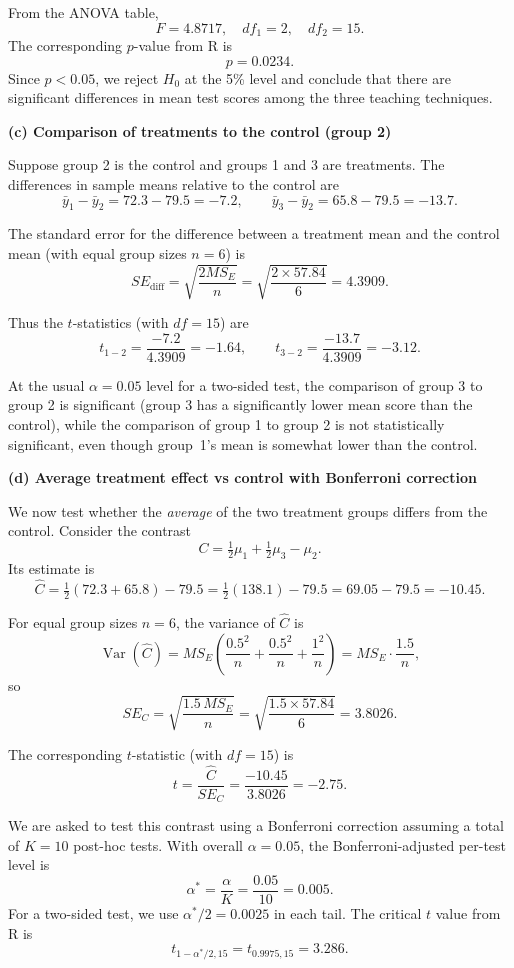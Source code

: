 \documentclass[answers,12pt,addpoints]{exam}
\begin{document}
From the ANOVA table,
\[
F = 4.8717,\quad df_1 = 2,\quad df_2 = 15.
\]
The corresponding $p$-value from R is
\[
p = 0.0234.
\]
Since $p < 0.05$, we reject $H_0$ at the 5\% level and conclude that there are
significant differences in mean test scores among the three teaching
techniques.

\medskip
\textbf{(c) Comparison of treatments to the control (group 2)}

Suppose group 2 is the control and groups 1 and 3 are treatments. The
differences in sample means relative to the control are
\[
\bar{y}_1 - \bar{y}_2 = 72.3 - 79.5 = -7.2,\qquad
\bar{y}_3 - \bar{y}_2 = 65.8 - 79.5 = -13.7.
\]

The standard error for the difference between a treatment mean and the control
mean (with equal group sizes $n=6$) is
\[
SE_{\text{diff}} = \sqrt{\frac{2 MS_E}{n}}
= \sqrt{\frac{2 \times 57.84}{6}} = 4.3909.
\]

Thus the $t$-statistics (with $df = 15$) are
\[
t_{1-2} = \frac{-7.2}{4.3909} = -1.64,\qquad
t_{3-2} = \frac{-13.7}{4.3909} = -3.12.
\]

At the usual $\alpha = 0.05$ level for a two-sided test, the comparison of
group 3 to group 2 is significant (group 3 has a significantly lower mean
score than the control), while the comparison of group 1 to group 2 is not
statistically significant, even though group~1's mean is somewhat lower than
the control.

\medskip
\textbf{(d) Average treatment effect vs control with Bonferroni correction}

We now test whether the \emph{average} of the two treatment groups differs from
the control. Consider the contrast
\[
C = \tfrac{1}{2}\mu_1 + \tfrac{1}{2}\mu_3 - \mu_2.
\]
Its estimate is
\[
\hat{C} = \tfrac{1}{2}(72.3 + 65.8) - 79.5
= \tfrac{1}{2}(138.1) - 79.5 = 69.05 - 79.5 = -10.45.
\]

For equal group sizes $n=6$, the variance of $\hat{C}$ is
\[
\operatorname{Var}(\hat{C}) =
MS_E\left(\frac{0.5^2}{n} + \frac{0.5^2}{n} + \frac{1^2}{n}\right)
= MS_E\cdot\frac{1.5}{n},
\]
so
\[
SE_C = \sqrt{\frac{1.5\,MS_E}{n}}
= \sqrt{\frac{1.5 \times 57.84}{6}} = 3.8026.
\]

The corresponding $t$-statistic (with $df = 15$) is
\[
t = \frac{\hat{C}}{SE_C} = \frac{-10.45}{3.8026} = -2.75.
\]

We are asked to test this contrast using a Bonferroni correction assuming a
total of $K = 10$ post-hoc tests. With overall $\alpha = 0.05$, the
Bonferroni-adjusted per-test level is
\[
\alpha^* = \frac{\alpha}{K} = \frac{0.05}{10} = 0.005.
\]
For a two-sided test, we use $\alpha^*/2 = 0.0025$ in each tail. The critical
$t$ value from R is
\[
t_{1-\alpha^*/2,15} = t_{0.9975,15} = 3.286.
\]
\end{document}
